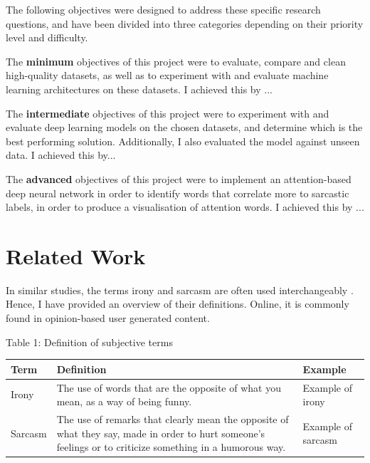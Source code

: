 \documentclass[12pt,a4paper]{article}
\begin{document}
\noindent The following objectives were designed to address these specific research questions, and have been divided into three categories depending on their priority level and difficulty.

The \textbf{minimum} objectives of this project were to evaluate, compare and clean high-quality datasets, as well as to experiment with and evaluate machine learning architectures on these datasets. I achieved this by ...

The \textbf{intermediate} objectives of this project were to experiment with and evaluate deep learning models on the chosen datasets, and determine which is the best performing solution. Additionally, I also evaluated the model against unseen data. I achieved this by...

The \textbf{advanced} objectives of this project were to implement an attention-based deep neural network in order to identify words that correlate more to sarcastic labels, in order to produce a visualisation of attention words. I achieved this by ...





\vfill

\section{Related Work}
In similar studies, the terms irony and sarcasm are often used interchangeably \cite{tsur2010icwsm}. Hence, I have provided an overview of their definitions. Online, it is commonly found in opinion-based user generated content.

\begin{center}
	Table 1: Definition of subjective terms
\end{center}
\begin{tabular}{p{3cm}p{8cm}p{5cm}}
	\hline
	\textbf{Term} & \textbf{Definition} & \textbf{Example}\\
	\hline\hline
	Irony & The use of words that are the opposite of what you mean, as a way of being funny. \cite{cambridgeirony2020} &  Example of irony\\
	\hline
	Sarcasm & The use of remarks that clearly mean the opposite of what they say, made in order to hurt someone's feelings or to criticize something in a humorous way. \cite{cambridgesarcasm2020} &  Example of sarcasm\\
	\hline
\end{tabular}\\
\end{document}
